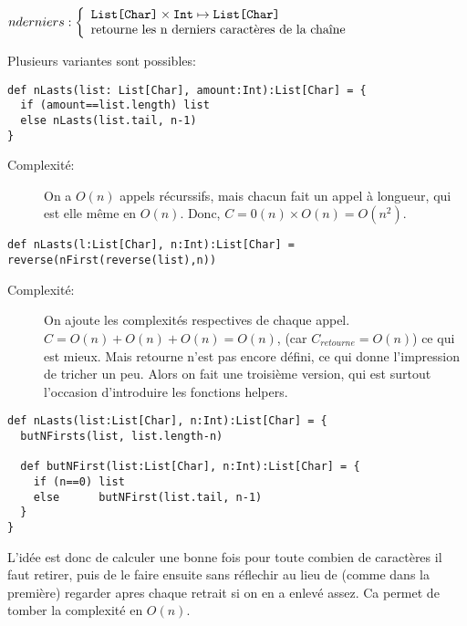 \documentclass[10pt]{article}\usepackage[nu]{esial}
\begin{document}
\begin{Question}
  $nderniers: \left\{
    \begin{array}{l}
      \text{\texttt{List[Char]}}\times\text{\texttt{Int}}\mapsto \text{\texttt{List[Char]}}\\
      \text{retourne les n derniers caractères de la chaîne}
    \end{array}\right.$  
\end{Question}
\begin{Reponse}
  Plusieurs variantes sont possibles:
  \begin{Verbatim}[label=version naive]
def nLasts(list: List[Char], amount:Int):List[Char] = {
  if (amount==list.length) list
  else nLasts(list.tail, n-1)
}    
  \end{Verbatim}
  \begin{description}
  \item[Complexité:] On a $O(n)$ appels récurssifs, mais chacun fait un appel à
    longueur, qui est elle même en $O(n)$. Donc, $C=0(n)\times
    O(n)=O(n^2)$. 
  \end{description}

  \begin{Verbatim}[label=avec retourne]
def nLasts(l:List[Char], n:Int):List[Char] = reverse(nFirst(reverse(list),n))
  \end{Verbatim}
  \begin{description}
  \item[Complexité:] On ajoute les complexités respectives de chaque appel. $C =
    O(n) + O(n) + O(n) = O(n)$, (car $C_{retourne}=O(n)$) ce qui est mieux. Mais
    retourne n'est pas encore défini, ce qui donne l'impression de tricher un
    peu. Alors on fait une troisième version, qui est surtout l'occasion
    d'introduire les fonctions helpers.
  \end{description}

  \begin{Verbatim}[label=avec fonction d'aide]
def nLasts(list:List[Char], n:Int):List[Char] = {
  butNFirsts(list, list.length-n) 

  def butNFirst(list:List[Char], n:Int):List[Char] = {
    if (n==0) list
    else      butNFirst(list.tail, n-1)
  }
}
  \end{Verbatim}

  L'idée est donc de calculer une bonne fois pour toute combien de caractères
  il faut retirer, puis de le faire ensuite sans réflechir au lieu de (comme
  dans la première) regarder apres chaque retrait si on en a enlevé assez. Ca
  permet de tomber la complexité en $O(n)$.
\end{Reponse}
\end{document}
